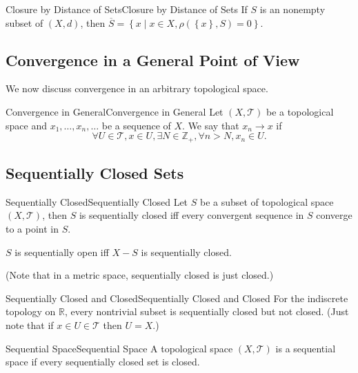 \documentclass[../main.tex]{subfiles}
\begin{document}
\begin{proposition}{Closure by Distance of Sets}{Closure by Distance of Sets}
If $S$ is an nonempty subset of $(X,d)$, then $\overline{S} = \left\{ x\mid x\in X, \rho(\left\{ x \right\},S)=0 \right\}$.
\end{proposition}

\subsection{Convergence in a General Point of View}
We now discuss convergence in an arbitrary topological space.

\begin{definition}{Convergence in General}{Convergence in General}
Let $(X,\mathcal{T})$ be a topological space and $x_1, \ldots ,x_n, \ldots $ be a sequence of $X$. We say that $x_n \rightarrow x$ if
\begin{equation*}
\forall U\in \mathcal{T},x\in U,\exists N\in \mathbb{Z}_+,\forall n>N, x_n\in U.
\end{equation*}
\end{definition}

\subsection{Sequentially Closed Sets}
\begin{definition}{Sequentially Closed}{Sequentially Closed}
Let $S$ be a subset of topological space $(X,\mathcal{T})$, then $S$ is sequentially closed iff every convergent sequence in $S$ converge to a point in $S$.

$S$ is sequentially open iff $X-S$ is sequentially closed.

(Note that in a metric space, sequentially closed is just closed.)
\end{definition}

\begin{example}{Sequentially Closed and Closed}{Sequentially Closed and Closed}
For the indiscrete topology on $\mathbb{R}$, every nontrivial subset is sequentially closed but not closed. (Just note that if $x\in U\in \mathcal{T}$ then $U=X$.)
\end{example}

\begin{definition}{Sequential Space}{Sequential Space}
A topological space $(X,\mathcal{T})$ is a sequential space if every sequentially closed set is closed.
\end{definition}
\end{document}
